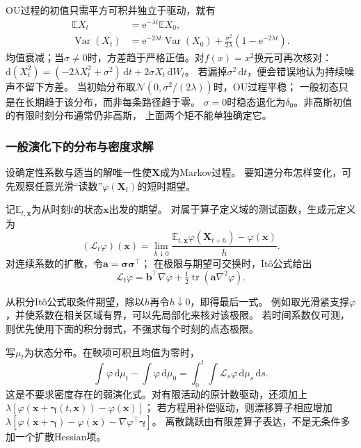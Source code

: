 OU过程的初值只需平方可积并独立于驱动，就有
\begin{align}
 \mathbb E X_t&=\mathrm e^{-\lambda t}\mathbb E X_0,
       \label{eq:dynamical-ou-mean}\\
 \operatorname{Var}(X_t)&=\mathrm e^{-2\lambda t}\operatorname{Var}(X_0)
       +\frac{\sigma^2}{2\lambda}(1-\mathrm e^{-2\lambda t}).
       \label{eq:dynamical-ou-variance}
\end{align}
均值衰减；当$\sigma\neq0$时，方差趋于严格正值。对$f(x)=x^2$换元可再次核对：
$\mathrm d(X_t^2)=(-2\lambda X_t^2+\sigma^2)\,\mathrm dt
                 +2\sigma X_t\,\mathrm dW_t$。
若漏掉$\sigma^2\,\mathrm dt$，便会错误地认为持续噪声不留下方差。
当初始分布取$\mathcal N(0,\sigma^2/(2\lambda))$时，OU过程平稳；
一般初态只是在长期趋于该分布，而非每条路径趋于零。
$\sigma=0$时稳态退化为$\delta_0$。非高斯初值的有限时刻分布通常仍非高斯，
上面两个矩不能单独确定它。

\subsubsection{一般演化下的分布与密度求解}
设确定性系数与适当的解唯一性使$\bm X$成为Markov过程。
要知道分布怎样变化，可先观察任意光滑“读数”$\varphi(\bm X_t)$的短时期望。
\begin{definition}[Itô扩散的生成元]
 \label{def:dynamical-diffusion-generator}
 记$\mathbb E_{t,\bm x}$为从时刻$t$的状态$\bm x$出发的期望。
 对属于算子定义域的测试函数，生成元定义为
 \[
  (\mathcal L_t\varphi)(\bm x)
    =\lim_{h\downarrow0}
       \frac{\mathbb E_{t,\bm x}\varphi(\bm X_{t+h})-\varphi(\bm x)}h.
 \]
 对连续系数的扩散，令$\bm a=\bm\sigma\bm\sigma^\top$；
 在极限与期望可交换时，Itô公式给出
 \[
  \mathcal L_t\varphi=\bm b^\top\nabla\varphi+
                      \tfrac12\operatorname{tr}(\bm a\nabla^2\varphi).
 \]
\end{definition}
从积分Itô公式取条件期望，除以$h$再令$h\downarrow0$，即得最后一式。
例如取光滑紧支撑$\varphi$，并使系数在相关区域有界，可以先局部化来核对该极限。
若时间系数仅可测，则优先使用下面的积分弱式，不强求每个时刻的点态极限。

写$\mu_t$为状态分布。在鞅项可积且均值为零时，
\[
 \int\varphi\,\mathrm d\mu_t-\int\varphi\,\mathrm d\mu_0
     =\int_0^t\int\mathcal L_s\varphi\,\mathrm d\mu_s\,\mathrm ds.
\]
这是不要求密度存在的弱演化式。对有限活动的原计数驱动，还须加上
$\lambda[\varphi(\bm x+\bm\gamma(t,\bm x))-\varphi(\bm x)]$；
若方程用补偿驱动，则漂移算子相应增加
$\lambda[\varphi(\bm x+\bm\gamma)-\varphi(\bm x)
                          -\nabla\varphi^\top\bm\gamma]$。
离散跳跃由有限差算子表达，不是无条件多加一个扩散Hessian项。

